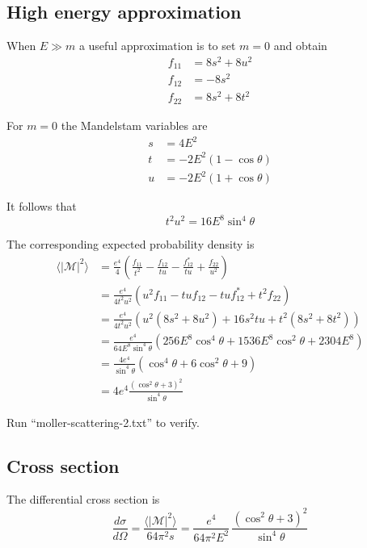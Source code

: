\documentclass[12pt]{article}
\begin{document}
\subsection*{High energy approximation}
When $E\gg m$ a useful approximation is to set $m=0$ and obtain
\begin{align*}
f_{11}&=8s^2+8u^2\\
f_{12}&=-8s^2\\
f_{22}&=8s^2+8t^2
\end{align*}

\noindent
For $m=0$ the Mandelstam variables are
\begin{align*}
s&=4E^2
\\
t&=-2E^2(1-\cos\theta)%
\\
u&=-2E^2(1+\cos\theta)%
\end{align*}

\noindent
It follows that
\begin{equation*}
t^2u^2=16E^8\sin^4\theta
\end{equation*}

\noindent
The corresponding expected probability density is
\begin{align*}
\langle|\mathcal{M}|^2\rangle
&=\frac{e^4}{4}
\left(
\frac{f_{11}}{t^2}-\frac{f_{12}}{tu}-\frac{f_{12}^*}{tu}+\frac{f_{22}}{u^2}
\right)
\\
&=\frac{e^4}{4t^2u^2}
\left(
u^2f_{11}-tuf_{12}-tuf_{12}^*+t^2f_{22}
\right)
\\
&=\frac{e^4}{4t^2u^2}
\left(
u^2\left(8s^2+8u^2\right)+16s^2tu+t^2\left(8s^2+8t^2\right)
\right)
\\
&=\frac{e^4}{64E^8\sin^4\theta}
\left(256 E^8\cos^4\theta+1536 E^8\cos^2\theta+2304 E^8\right)
\\
&=\frac{4e^4}{\sin^4\theta}
\left(\cos^4\theta+6\cos^2\theta+9\right)
\\
&=4e^4\frac{\left(\cos^2\theta+3\right)^2}{\sin^4\theta}
\end{align*}

\noindent
Run ``moller-scattering-2.txt'' to verify.

\subsection*{Cross section}
The differential cross section is
\begin{equation*}
\frac{d\sigma}{d\Omega}
=\frac{\langle|\mathcal{M}|^2\rangle}{64\pi^2s}
=\frac{e^4}{64\pi^2E^2}\,\frac{\left(\cos^2\theta+3\right)^2}{\sin^4\theta}
\end{equation*}
\end{document}
